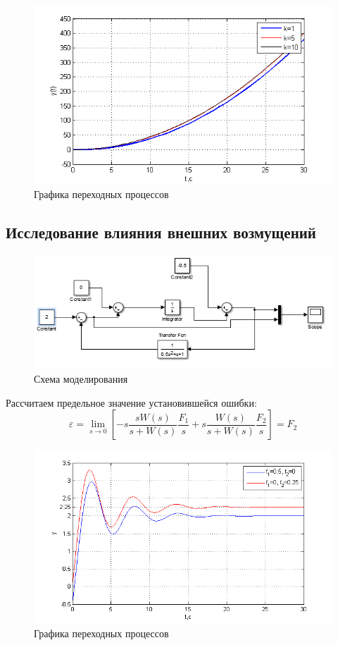 \documentclass[a4paper, 11pt]{article}
\begin{document}
\begin{center}
	\begin{figure}[h]
		\centering
		\includegraphics[width=0.7\linewidth]{8}
		\caption{Графика переходных процессов }
		\label{fig:8}
	\end{figure}
\end{center}
\clearpage
\begin{center}
	\section*{Исследование влияния внешних возмущений}\hfill\par
\end{center}
\begin{figure}[h]
	\centering
	\includegraphics[width=0.7\linewidth]{9}
	\caption{Схема моделирования}
	\label{fig:9}
\end{figure}
Рассчитаем предельное значение установившейся ошибки:
\begin{equation}
\varepsilon  = \mathop {\lim }\limits_{s \to 0} [ - s\frac{{sW(s)}}{{s + W(s)}}\frac{{{F_1}}}{s} + s\frac{{W(s)}}{{s + W(s)}}\frac{{{F_2}}}{s}] = {F_2}
\end{equation}
\begin{center}
	\begin{figure}[H]
		\centering
			\includegraphics[width=0.7\linewidth]{10}
		\caption{Графика переходных процессов}
		\label{fig:10}
	\end{figure}
\end{center}
\end{document}
